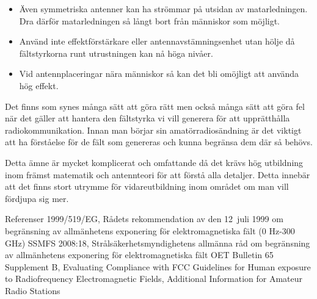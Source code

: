 \begin{itemize}
\item Även symmetriska antenner kan ha strömmar på utsidan av
matarledningen. Dra därför matarledningen så långt bort från människor
som möjligt.

\item Använd inte effektförstärkare eller antennavstämningsenhet utan
hölje då fältstyrkorna runt utrustningen kan nå höga nivåer.

\item Vid antennplaceringar nära människor så kan det bli omöjligt att
använda hög effekt.
\end{itemize}

Det finns som synes många sätt att göra rätt men också många sätt att
göra fel när det gäller att hantera den fältstyrka vi vill generera
för att upprätthålla radiokommunikation. Innan man börjar sin
amatörradiosändning är det viktigt att ha förståelse för de fält
som genereras och kunna begränsa dem där så behövs.

Detta ämne är mycket komplicerat och omfattande då det krävs hög
utbildning inom främst matematik och antennteori för att förstå alla
detaljer. Detta innebär att det finns stort utrymme för
vidareutbildning inom området om man vill fördjupa sig mer.


Referenser
1999/519/EG, Rådets rekommendation av den 12~juli 1999 om begränsning av allmänhetens exponering för
elektromagnetiska fält (0 Hz-300 GHz)
SSMFS 2008:18, Strålsäkerhetsmyndighetens allmänna råd om begränsning av allmänhetens exponering för
elektromagnetiska fält
OET Bulletin 65 Supplement B, Evaluating Compliance with FCC Guidelines for Human exposure to
Radiofrequency Electromagnetic Fields, Additional Information for Amateur Radio Stations

